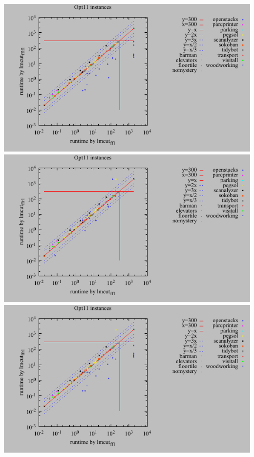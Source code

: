 \includegraphics{tables/opt11-time-lmcut_ff-lmcut_fflf.pdf}
\linebreak
\includegraphics{tables/opt11-time-lmcut_ff-lmcut_ffr.pdf}
\linebreak
\includegraphics{tables/opt11-time-lmcut_ff-lmcut_lfr.pdf}
\linebreak
